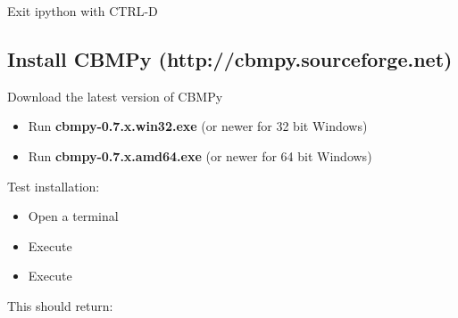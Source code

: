 \documentclass[a4paper,11pt,english]{sphinxmanual}
\begin{document}
Exit ipython with CTRL-D


\subsection{Install CBMPy (http://cbmpy.sourceforge.net)}
\label{install_doc:install-cbmpy-http-cbmpy-sourceforge-net}
Download the latest version of CBMPy
\begin{itemize}
\item {} 
Run \textbf{cbmpy-0.7.x.win32.exe} (or newer for 32 bit Windows)

\item {} 
Run \textbf{cbmpy-0.7.x.amd64.exe} (or newer for 64 bit Windows)

\end{itemize}

Test installation:
\begin{itemize}
\item {} 
Open a terminal

\item {} 
Execute 

\item {} 
Execute 

\end{itemize}

This should return:
\end{document}

